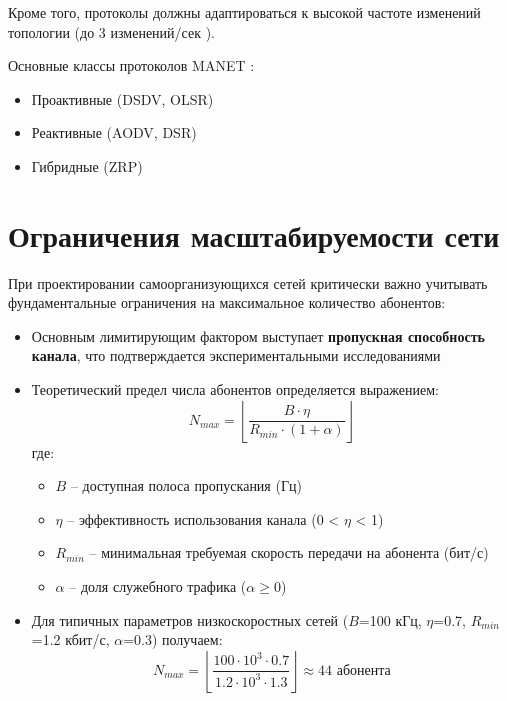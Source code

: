 Кроме того, протоколы должны адаптироваться к высокой частоте изменений топологии (до 3 изменений/сек \cite{sen2009survey}).

Основные классы протоколов MANET \cite{gupta2011routing}:
\begin{itemize}
    \item Проактивные (DSDV, OLSR)
    \item Реактивные (AODV, DSR)
    \item Гибридные (ZRP)
\end{itemize}

\section{Ограничения масштабируемости сети} \label{sec:scalability_limits}

При проектировании самоорганизующихся сетей критически важно учитывать фундаментальные ограничения на максимальное количество абонентов:

\begin{itemize}
    \item Основным лимитирующим фактором выступает \textbf{пропускная способность канала}, что подтверждается экспериментальными исследованиями \cite{zemlianov2005capacity}
    
    \item Теоретический предел числа абонентов определяется выражением:
    \begin{equation}
    N_{max} = \left\lfloor \frac{B \cdot \eta}{R_{min} \cdot (1 + \alpha)} \right\rfloor
    \end{equation}
    где:
    \begin{itemize}
        \item $B$ -- доступная полоса пропускания (Гц)
        \item $\eta$ -- эффективность использования канала (0 < $\eta$ < 1)
        \item $R_{min}$ -- минимальная требуемая скорость передачи на абонента (бит/с)
        \item $\alpha$ -- доля служебного трафика ($\alpha \geq 0$)
    \end{itemize}
    
    \item Для типичных параметров низкоскоростных сетей ($B$=100 кГц, $\eta$=0.7, $R_{min}$=1.2 кбит/с, $\alpha$=0.3) получаем:
    \[
    N_{max} = \left\lfloor \frac{100 \cdot 10^3 \cdot 0.7}{1.2 \cdot 10^3 \cdot 1.3} \right\rfloor \approx 44 \text{ абонента}
    \]
\end{itemize}

